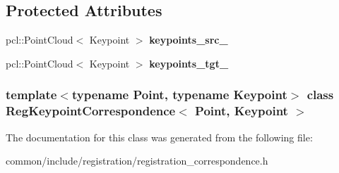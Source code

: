 \subsection*{Protected Attributes}
\begin{DoxyCompactItemize}
\item 
\hypertarget{classRegKeypointCorrespondence_a3a8fe81b6aa6ef704e89ce1a9e41ec28}{
pcl::PointCloud$<$ Keypoint $>$ {\bfseries keypoints\_\-src\_\-}}
\label{classRegKeypointCorrespondence_a3a8fe81b6aa6ef704e89ce1a9e41ec28}

\item 
\hypertarget{classRegKeypointCorrespondence_a02f55a21dc55bddb6727a62fe0871660}{
pcl::PointCloud$<$ Keypoint $>$ {\bfseries keypoints\_\-tgt\_\-}}
\label{classRegKeypointCorrespondence_a02f55a21dc55bddb6727a62fe0871660}

\end{DoxyCompactItemize}
\subsubsection*{template$<$typename Point, typename Keypoint$>$ class RegKeypointCorrespondence$<$ Point, Keypoint $>$}



The documentation for this class was generated from the following file:\begin{DoxyCompactItemize}
\item 
common/include/registration/registration\_\-correspondence.h\end{DoxyCompactItemize}
